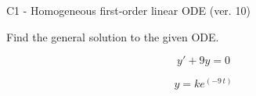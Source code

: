 \begin{exercise}
  \begin{exerciseTitle}C1 - Homogeneous first-order linear ODE (ver. 10)\end{exerciseTitle}
  \begin{exerciseStatement}
    
Find the general solution to the given ODE.

    
\[y'+9y=0\]

  \end{exerciseStatement}
  \begin{exerciseAnswer}
    
\[y= k e^{\left(-9 \, t\right)}\]

  \end{exerciseAnswer}
\end{exercise}